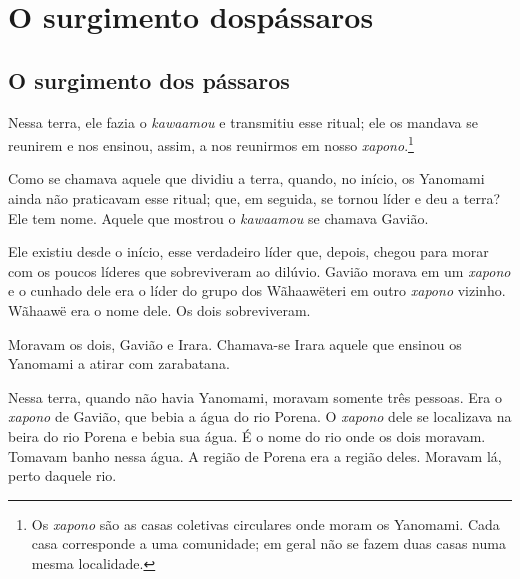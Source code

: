 \part[O surgimento dos pássaros]{O surgimento dos\break pássaros}

\chapter{O surgimento dos pássaros}
 
 

Nessa terra, ele fazia o \textit{kawaamou} e transmitiu esse ritual; ele os
mandava se reunirem e nos ensinou, assim, a nos
reunirmos em nosso \textit{xapono}.\footnote{Os \textit{xapono} são as casas coletivas circulares onde moram os Yanomami. Cada casa corresponde a uma comunidade; em geral não se fazem duas casas numa mesma localidade.} 

Como se chamava aquele que dividiu a terra, quando, no início, os
Yanomami ainda não praticavam esse ritual; que, em seguida, se tornou
líder e deu a terra? Ele tem nome. Aquele que mostrou
o \textit{kawaamou} se chamava Gavião.

Ele existiu desde o início, esse verdadeiro líder que, depois, chegou
para morar com os poucos líderes que sobreviveram ao dilúvio. Gavião
morava em um \textit{xapono} e o cunhado dele era o líder do grupo dos
Wãhaawëteri em outro \textit{xapono} vizinho. Wãhaawë era o nome
dele. Os dois sobreviveram.


Moravam os dois, Gavião e Irara. Chamava-se Irara aquele que ensinou os
Yanomami a atirar com zarabatana.

Nessa terra, quando não havia Yanomami, moravam somente três pessoas.
Era o \textit{xapono} de Gavião, que bebia a água do rio Porena. O \textit{xapono} dele se
localizava na beira do rio Porena e bebia sua água. É o nome do rio onde
os dois moravam. Tomavam banho nessa água. A região de Porena era a região
deles. Moravam lá, perto daquele rio. 

